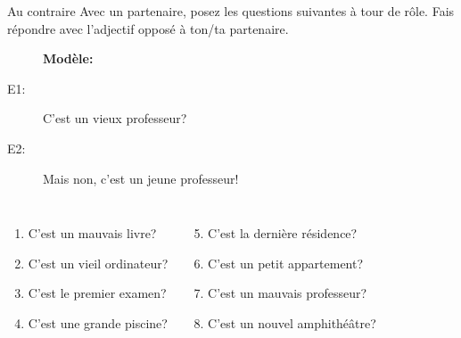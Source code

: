 \begin{frame}{Au contraire}
  Avec un partenaire, posez les questions suivantes à tour de rôle.
  Fais répondre avec l'adjectif opposé à ton/ta partenaire. \\
  \begin{center}
    \begin{description}
      \item[] \textbf{Modèle:}
      \item[E1:] C'est un vieux professeur?
      \item[E2:] Mais non, c'est un jeune professeur!
    \end{description}
    \begin{columns}
        \begin{enumerate}
          \item C'est un mauvais livre?
          \item C'est un vieil ordinateur?
          \item C'est le premier examen?
          \item C'est une grande piscine?
        \end{enumerate}
        \begin{enumerate}
          \setcounter{enumi}{4}
          \item C'est la dernière résidence?
          \item C'est un petit appartement?
          \item C'est un mauvais professeur?
          \item C'est un nouvel amphithéâtre?
        \end{enumerate}
    \end{columns}
  \end{center}
\end{frame}